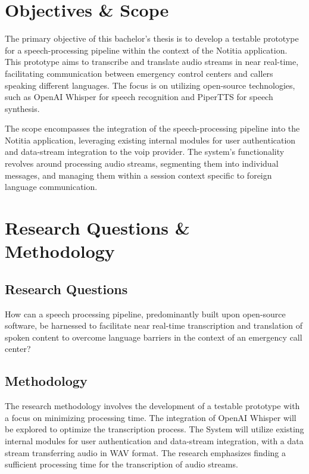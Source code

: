 
\section{Objectives \& Scope}

The primary objective of this bachelor's thesis is to develop a testable prototype for a speech-processing pipeline 
within the context of the Notitia application. This prototype aims to transcribe and translate audio streams in near 
real-time, facilitating communication between emergency control centers and callers speaking different languages. The 
focus is on utilizing open-source technologies, such as OpenAI Whisper for speech recognition and PiperTTS for 
speech synthesis.

The scope encompasses the integration of the speech-processing pipeline into the Notitia application, leveraging 
existing internal modules for user authentication and data-stream integration to the \ac{voip} provider. The 
system's functionality revolves around processing audio streams, segmenting them into individual messages, and managing 
them within a session context specific to foreign language communication.


\section{Research Questions \& Methodology}

\subsection{Research Questions}

How can a speech processing pipeline, predominantly built upon open-source software, be harnessed to facilitate near 
real-time transcription and translation of spoken content to overcome language barriers in the context of an emergency 
call center?

\subsection{Methodology}

The research methodology involves the development of a testable prototype with a focus on minimizing processing time. 
The integration of OpenAI Whisper will be explored to optimize the transcription process. The System will utilize 
existing internal modules for user authentication and data-stream integration, with a data stream transferring audio 
in WAV format. The research emphasizes finding a sufficient processing time for the transcription of audio streams.

